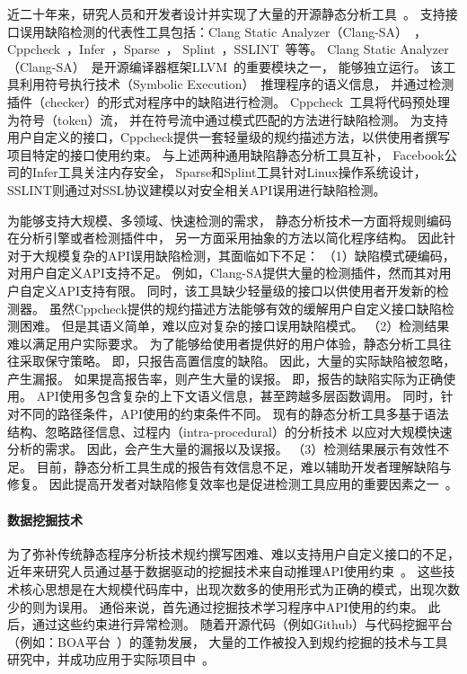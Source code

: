 近二十年来，研究人员和开发者设计并实现了大量的开源静态分析工具~\cite{wiki-static-tool}。
支持接口误用缺陷检测的代表性工具包括：Clang Static Analyzer（Clang-SA）~\cite{clang-sa}，
Cppcheck~\cite{cppcheck}，Infer~\cite{infer}，Sparse~\cite{sparse}，
Splint~\cite{splint}，SSLINT~\cite{15-sp-sslint}等等。
Clang Static Analyzer（Clang-SA）~\cite{clang-sa}是开源编译器框架LLVM~\cite{llvm}的重要模块之一，
能够独立运行。
该工具利用符号执行技术（Symbolic Execution）~\cite{13-acm-se}推理程序的语义信息，
并通过检测插件（checker）的形式对程序中的缺陷进行检测。
Cppcheck~\cite{cppcheck}工具将代码预处理为符号（token）流，
并在符号流中通过模式匹配的方法进行缺陷检测。
为支持用户自定义的接口，Cppcheck提供一套轻量级的规约描述方法，以供使用者撰写项目特定的接口使用约束。
与上述两种通用缺陷静态分析工具互补，
Facebook公司的Infer工具关注内存安全，
Sparse和Splint工具针对Linux操作系统设计，
SSLINT则通过对SSL协议建模以对安全相关API误用进行缺陷检测。


为能够支持大规模、多领域、快速检测的需求，
静态分析技术一方面将规则编码在分析引擎或者检测插件中，
另一方面采用抽象的方法以简化程序结构。
因此针对于大规模复杂的API误用缺陷检测，其面临如下不足：
（1）缺陷模式硬编码，对用户自定义API支持不足。
例如，Clang-SA提供大量的检测插件，然而其对用户自定义API支持有限。
同时，该工具缺少轻量级的接口以供使用者开发新的检测器。
虽然Cppcheck提供的规约描述方法能够有效的缓解用户自定义接口缺陷检测困难。
但是其语义简单，难以应对复杂的接口误用缺陷模式。
（2）检测结果难以满足用户实际要求。
为了能够给使用者提供好的用户体验，静态分析工具往往采取保守策略。
即，只报告高置信度的缺陷。
因此，大量的实际缺陷被忽略，产生漏报。
如果提高报告率，则产生大量的误报。
即，报告的缺陷实际为正确使用。
API使用多包含复杂的上下文语义信息，甚至跨越多层函数调用。
同时，针对不同的路径条件，API使用的约束条件不同。
现有的静态分析工具多基于语法结构、忽略路径信息、过程内（intra-procedural）的分析技术
以应对大规模快速分析的需求。
因此，会产生大量的漏报以及误报。
（3）检测结果展示有效性不足。
目前，静态分析工具生成的报告有效信息不足，难以辅助开发者理解缺陷与修复。
因此提高开发者对缺陷修复效率也是促进检测工具应用的重要因素之一~\cite{13-icse-donotuse}。

\paragraph{数据挖掘技术}
为了弥补传统静态程序分析技术规约撰写困难、难以支持用户自定义接口的不足，
近年来研究人员通过基于数据驱动的挖掘技术来自动推理API使用约束~\cite{13survey}。
这些技术核心思想是在大规模代码库中，出现次数多的使用形式为正确的模式，出现次数少的则为误用。
通俗来说，首先通过挖掘技术学习程序中API使用的约束。
此后，通过这些约束进行异常检测。
随着开源代码（例如Github）与代码挖掘平台（例如：BOA平台~\cite{15-tosem-boa}）的蓬勃发展，
大量的工作被投入到规约挖掘的技术与工具研究中，并成功应用于实际项目中~\cite{survey18}。

